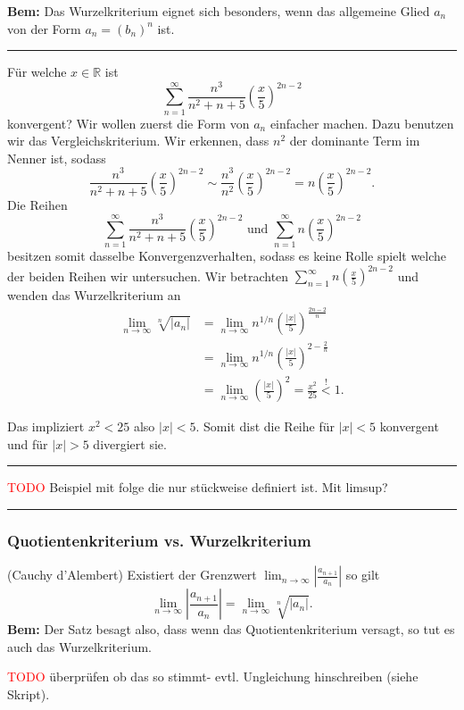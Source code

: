 \documentclass[a4paper,landscape,8pt]{extarticle}
\newcommand{\R}{\mathbb{R}}
\newcommand{\abs}[1]{\left\lvert #1 \right\rvert}
\newcommand{\todo}{\textcolor{red}{TODO }}
\newcommand{\sep}{\vspace{5pt}\noindent\hrule\vspace{5pt}}
\newcommand{\Bem}{\textbf{Bem: }}
\begin{document}
\begin{multicols*}{4}
\Bem Das Wurzelkriterium eignet sich besonders, wenn das allgemeine Glied $a_n$
von der Form $a_n = (b_n)^n$ ist.

\begin{warmup}
\sep

\Bsp Für welche $x\in \R$ ist
\[
\sum_{n=1}^{\infty} \frac{n^3}{n^2+n+5}\left(\frac{x}{5}\right)^{2n-2}
\] 
konvergent? Wir wollen zuerst die Form von $a_n$ einfacher machen. Dazu benutzen
wir das Vergleichskriterium. Wir erkennen, dass $n^2$ der dominante Term im
Nenner ist, sodass
\[
\frac{n^3}{n^2+n+5}\left(\frac{x}{5}\right)^{2n-2}
\sim
\frac{n^3}{n^2}\left(\frac{x}{5}\right)^{2n-2}
=
n\left(\frac{x}{5}\right)^{2n-2}.
\]
Die Reihen
\[
\sum_{n=1}^\infty\frac{n^3}{n^2+n+5}\left(\frac{x}{5}\right)^{2n-2}
\text{ und }
\sum_{n=1}^\infty n\left(\frac{x}{5}\right)^{2n-2}
\]
besitzen somit dasselbe Konvergenzverhalten, sodass es keine Rolle spielt welche der
beiden Reihen wir untersuchen. Wir betrachten $\sum_{n=1}^\infty n
(\frac{x}{5})^{2n-2}$ und wenden das Wurzelkriterium an
\begin{align*}
\lim_{n\to\infty}\sqrt[n]{\abs{a_n}}
&=
\lim_{n\to\infty} n^{1/n} \left(\frac{\abs{x}}{5}\right)^{\frac{2n-2}{n}}\\
&=
\lim_{n\to\infty} n^{1/n}
\left(\frac{\abs{x}}{5}\right)^{2-\tfrac{2}{n}}\\
&=
\lim_{n\to\infty} \left(\frac{\abs{x}}{5}\right)^2
=\frac{x^2}{25}\stackrel{!}{<} 1.
\end{align*}

Das impliziert $x^2<25$ also $\abs{x}<5$. Somit dist die Reihe für $\abs{x}<5$
konvergent und für $\abs{x} > 5$ divergiert sie.

\sep

\todo{Beispiel mit folge die nur stückweise definiert ist. Mit limsup?}
\end{warmup}

\sep

\subsubsection{Quotientenkriterium vs. Wurzelkriterium}

\Satz (Cauchy d'Alembert) Existiert der Grenzwert $\lim_{n\to
\infty}\abs{\frac{a_{n+1}}{a_n}}$ so gilt
\[
\lim_{n\to\infty}\abs{\frac{a_{n+1}}{a_n}} =
\lim_{n\to\infty}\sqrt[n]{\abs{a_n}}.
\]
\Bem Der Satz besagt also, dass wenn das Quotientenkriterium versagt, so tut es
auch das Wurzelkriterium.

\begin{warmup}
\todo überprüfen ob das so stimmt- evtl. Ungleichung hinschreiben (siehe
Skript).
\end{warmup}


\end{multicols*}
\end{document}
